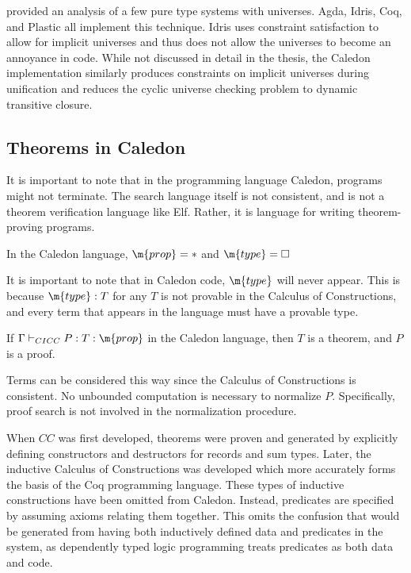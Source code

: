 \citet{harper1991type} provided an analysis of a few pure type systems with universes.
Agda, Idris, Coq,
and Plastic \citep{callaghan2001implementation} all implement this technique.
Idris uses constraint satisfaction to allow for implicit universes
and thus does not allow the universes to become an annoyance in code. 
While not discussed in detail in the thesis, the Caledon implementation similarly produces constraints on implicit 
universes during unification and reduces the cyclic universe checking problem to dynamic transitive closure.

\subsection{Theorems in Caledon}

It is important to note that in the programming language Caledon, programs might not terminate.  
The search language itself is not consistent, and is not a theorem verification language like Elf.  
Rather, it is language for writing theorem-proving programs.  

\begin{definition}
In the Caledon language, $\m{prop} = *$ and $\m{type} = \Box$
\end{definition}

It is important to note that in Caledon code, $\m{type}$ will never appear.  This is because $\m{type} : T$ for any $T$
is not provable in the Calculus of Constructions, and every term that appears in the language must have a provable type.

\begin{definition}
If $\Gamma \vdash_{CICC} P : T : \m{prop}$ in the Caledon language, then $T$ is a theorem, and $P$ is a proof.
\end{definition}

Terms can be considered this way since the Calculus of Constructions is consistent.
No unbounded computation is necessary to normalize $P$.
Specifically, proof search is not involved in the normalization procedure.

When $CC$ was first developed, theorems were proven and generated by explicitly defining
constructors and destructors for records and sum types.  Later, the inductive Calculus of Constructions was developed 
\citep{coquand1990inductively} which more accurately forms the basis of the Coq programming language.  These types of inductive
constructions have been omitted from Caledon.  Instead, predicates are specified by assuming axioms relating them together.
This omits the confusion that would be generated from having both inductively defined data and predicates in the system, as 
dependently typed logic programming treats predicates as both data and code.

